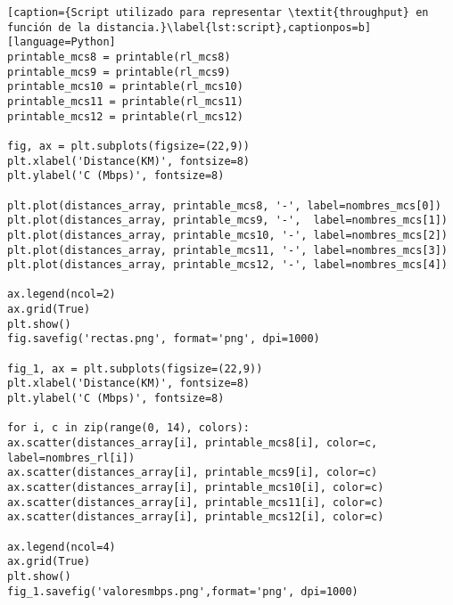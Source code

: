 \begin{lstlisting}[caption={Script utilizado para representar \textit{throughput} en función de la distancia.}\label{lst:script},captionpos=b][language=Python]
printable_mcs8 = printable(rl_mcs8)
printable_mcs9 = printable(rl_mcs9)
printable_mcs10 = printable(rl_mcs10)
printable_mcs11 = printable(rl_mcs11)
printable_mcs12 = printable(rl_mcs12)

fig, ax = plt.subplots(figsize=(22,9))
plt.xlabel('Distance(KM)', fontsize=8)
plt.ylabel('C (Mbps)', fontsize=8)

plt.plot(distances_array, printable_mcs8, '-', label=nombres_mcs[0])
plt.plot(distances_array, printable_mcs9, '-',  label=nombres_mcs[1])
plt.plot(distances_array, printable_mcs10, '-', label=nombres_mcs[2])
plt.plot(distances_array, printable_mcs11, '-', label=nombres_mcs[3])
plt.plot(distances_array, printable_mcs12, '-', label=nombres_mcs[4])

ax.legend(ncol=2)    
ax.grid(True)
plt.show()
fig.savefig('rectas.png', format='png', dpi=1000)

fig_1, ax = plt.subplots(figsize=(22,9))
plt.xlabel('Distance(KM)', fontsize=8)
plt.ylabel('C (Mbps)', fontsize=8)

for i, c in zip(range(0, 14), colors):
ax.scatter(distances_array[i], printable_mcs8[i], color=c, label=nombres_rl[i])
ax.scatter(distances_array[i], printable_mcs9[i], color=c)
ax.scatter(distances_array[i], printable_mcs10[i], color=c)
ax.scatter(distances_array[i], printable_mcs11[i], color=c)
ax.scatter(distances_array[i], printable_mcs12[i], color=c)

ax.legend(ncol=4)    
ax.grid(True)
plt.show()
fig_1.savefig('valoresmbps.png',format='png', dpi=1000)
\end{lstlisting}